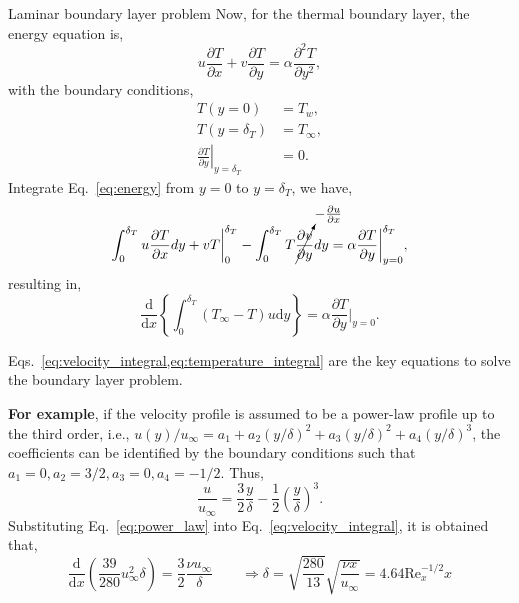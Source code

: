 \documentclass[9pt, aspectratio=169, handout]{beamer}
\begin{document}
\begin{frame}[allowframebreaks]{Laminar boundary layer problem}
    Now, for the thermal boundary layer, the energy equation is,
    \begin{equation}
        u\frac{\partial T}{\partial x} + v\frac{\partial T}{\partial y} = \alpha\frac{\partial^2 T}{\partial y^2}, \label{eq:energy}
    \end{equation}
    with the boundary conditions,
    \begin{subequations}
        \begin{align}
            T(y=0) &= T_w, \\
            T(y=\delta_T) &= T_\infty, \\
            \left.\frac{\partial T}{\partial y}\right|_{y=\delta_T} &= 0.
        \end{align}
    \end{subequations}
    Integrate Eq.~\eqref{eq:energy} from $y=0$ to $y=\delta_T$, we have,
    \begin{equation}
        \int_0^{\delta_T} u\frac{\partial T}{\partial x}dy + vT\bigg|_0^{\delta_T} - \int_0^{\delta_T} T\cancelto{-\frac{\partial u}{\partial x}}{\frac{\partial v}{\partial y}}dy = \alpha\frac{\partial T}{\partial y}\bigg|_{y=0}^{\delta_T},
    \end{equation}
    resulting in,
    \begin{equation}
        \frac{\mathrm{d} }{\mathrm{d} x} \left\lbrace \int_0^{\delta_T} (T_\infty - T) u \mathrm{d}y \right\rbrace = \alpha \frac{\partial T}{\partial y}\bigg|_{y=0}. \label{eq:temperature_integral}
    \end{equation}

    Eqs.~\cref{eq:velocity_integral,eq:temperature_integral} are the key equations to solve the boundary layer problem.

    \textbf{For example}, if the velocity profile is assumed to be a power-law profile up to the third order, i.e., $u(y)/u_{\infty} = a_1 + a_2 (y/\delta)^2 + a_3(y/\delta)^2 + a_4(y/\delta)^3$, the coefficients can be identified by the boundary conditions such that $a_1=0, a_2 = 3/2, a_3=0, a_4=-1/2$. Thus,
    \begin{equation}
        \frac{u}{u_{\infty}} = \frac{3}{2} \frac{y}{\delta} - \frac{1}{2} \left(\frac{y}{\delta}\right)^3. \label{eq:power_law}
    \end{equation}
    Substituting Eq.~\eqref{eq:power_law} into Eq.~\eqref{eq:velocity_integral}, it is obtained that,
    \begin{equation}
        \frac{\mathrm{d} }{\mathrm{d} x} \left(\frac{39}{280} u_{\infty}^2 \delta \right) = \frac{3}{2}\frac{\nu u_{\infty}}{\delta} \qquad \Rightarrow \delta = \sqrt{\frac{280}{13}} \sqrt{\frac{\nu x}{u_{\infty}}} = 4.64 \mathrm{Re}_x^{-1/2} x
    \end{equation}


\end{frame}
\end{document}
